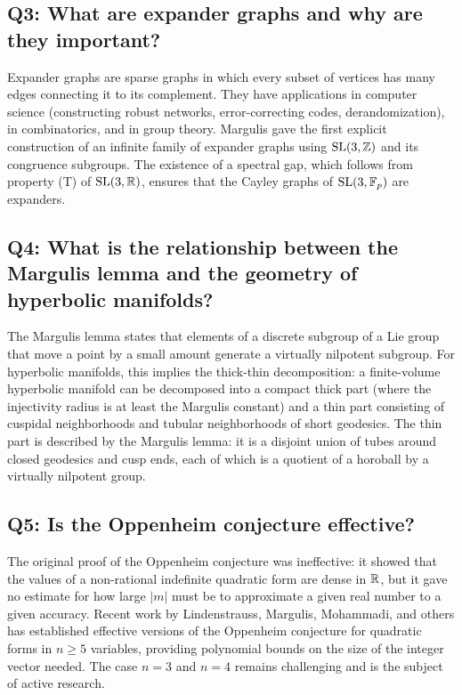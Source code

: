 \subsection*{Q3: What are expander graphs and why are they important?}

Expander graphs are sparse graphs in which every subset of vertices has many edges connecting it to its complement. They have applications in computer science (constructing robust networks, error-correcting codes, derandomization), in combinatorics, and in group theory. Margulis gave the first explicit construction of an infinite family of expander graphs using \(\operatorname{SL}(3,\mathbb{Z})\) and its congruence subgroups. The existence of a spectral gap, which follows from property (T) of \(\operatorname{SL}(3,\mathbb{R})\), ensures that the Cayley graphs of \(\operatorname{SL}(3,\mathbb{F}_p)\) are expanders.

\subsection*{Q4: What is the relationship between the Margulis lemma and the geometry of hyperbolic manifolds?}

The Margulis lemma states that elements of a discrete subgroup of a Lie group that move a point by a small amount generate a virtually nilpotent subgroup. For hyperbolic manifolds, this implies the thick-thin decomposition: a finite-volume hyperbolic manifold can be decomposed into a compact thick part (where the injectivity radius is at least the Margulis constant) and a thin part consisting of cuspidal neighborhoods and tubular neighborhoods of short geodesics. The thin part is described by the Margulis lemma: it is a disjoint union of tubes around closed geodesics and cusp ends, each of which is a quotient of a horoball by a virtually nilpotent group.

\subsection*{Q5: Is the Oppenheim conjecture effective?}

The original proof of the Oppenheim conjecture was ineffective: it showed that the values of a non-rational indefinite quadratic form are dense in \(\mathbb{R}\), but it gave no estimate for how large \(|m|\) must be to approximate a given real number to a given accuracy. Recent work by Lindenstrauss, Margulis, Mohammadi, and others has established effective versions of the Oppenheim conjecture for quadratic forms in \(n \geq 5\) variables, providing polynomial bounds on the size of the integer vector needed. The case \(n = 3\) and \(n = 4\) remains challenging and is the subject of active research.

